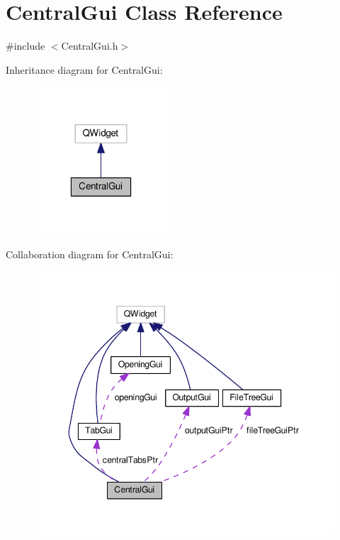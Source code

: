 \hypertarget{class_central_gui}{\section{Central\-Gui Class Reference}
\label{class_central_gui}
}


{\ttfamily \#include $<$Central\-Gui.\-h$>$}



Inheritance diagram for Central\-Gui\-:\nopagebreak
\begin{figure}[H]
\begin{center}
\leavevmode
\includegraphics[width=142pt]{class_central_gui__inherit__graph}
\end{center}
\end{figure}


Collaboration diagram for Central\-Gui\-:\nopagebreak
\begin{figure}[H]
\begin{center}
\leavevmode
\includegraphics[width=346pt]{class_central_gui__coll__graph}
\end{center}
\end{figure}
